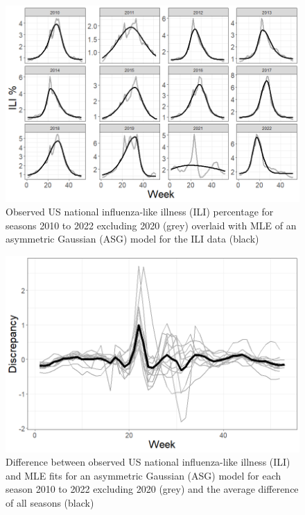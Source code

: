 \begin{figure}[hbt!]
    \centering
    \includegraphics[scale=.5]{Images/asg_fits.png}
    \caption{Observed US national influenza-like illness (ILI) percentage for 
    seasons 2010 to 2022 excluding 2020 (grey) overlaid with MLE of an 
    asymmetric Gaussian (ASG) model for the ILI data (black)}
    \label{fig:asg_fits}
\end{figure}

\begin{figure}[hbt!]
    \centering
    \includegraphics[scale=.45]{Images/discrepancy.png}
    \caption{Difference between observed US national influenza-like illness 
    (ILI) and MLE fits for an asymmetric Gaussian (ASG) model for each season 
    2010 to 2022 excluding 2020 (grey) and the average difference of all 
    seasons (black)}
    \label{fig:discrepancy}
\end{figure}

